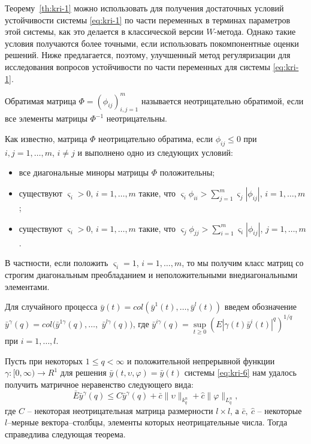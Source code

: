 Теорему~\ref{th:kri-1} можно использовать для получения достаточных условий
устойчивости системы \eqref{eq:kri-1} по части переменных в терминах параметров
этой системы, как это делается в классической версии $W$-метода.
Однако такие условия получаются более точными, если использовать
покомпонентные оценки решений. Ниже предлагается, поэтому,
улучшенный метод регуляризации для исследования вопросов
устойчивости по части переменных для системы \eqref{eq:kri-1}.

\begin{definition}\label{def:kri-4}
    Обратимая матрица $\Phi =
    (\phi_{ij})^m_{i,j=1}$ называется неотрицательно обратимой, если все
    элементы матрицы $\Phi^{-1}$ неотрицательны.
\end{definition}

Как известно, матрица $\Phi$ неотрицательно обратима, если
$\phi_{ij} \leq 0$ при $i, j = 1,\dots,m$, $i\neq j$ и выполнено одно
из следующих условий:
\begin{itemize}
    \item все диагональные миноры матрицы $\Phi$ положительны;
    
    \item существуют $\varsigma _i > 0$, $i = 1,\dots,m$ такие, что
    $\varsigma_i \phi_{ii} > \sum \limits _{j=1}^m \varsigma_j
    |\phi_{ij}|$, $i = 1,\dots,m$;
    
    \item существуют $\varsigma _i>0$, $i = 1,\dots,m$ такие, что $\varsigma_j
    \phi_{jj} > \sum \limits _{i=1}^m\varsigma_i |\phi_{ij}|$, $j =
    1,\dots,m$.
\end{itemize}

В частности, если положить $\varsigma _i = 1$, $i = 1,\dots,m$, то мы
получим класс матриц со строгим диагональным преобладанием и
неположительными внедиагональными элементами.

Для случайного процесса $\bar y(t) = col(\bar y^1(t),\dots, \bar
y^l(t))$ введем обозначение $ \bar y^\gamma (q) = col (\bar
y^{1\gamma }(q),\dots,$ $\bar y^{l\gamma }(q))$, где $\bar y^{i\gamma
}(q) = \sup \limits _{t \geq 0}\left (E|\gamma (t) \bar
y^i(t)|^{q}\right )^{1/q}$ при $i = 1,\dots,l$.

Пусть при некоторых $1\le q < \infty $ и положительной непрерывной
функции $\gamma :[0, \infty) \rightarrow R^1 $ для решения $\bar
y(t,\upsilon,\varphi) =  \bar y(t)$ системы \eqref{eq:kri-6} нам удалось
получить матричное неравенство следующего вида:
\begin{equation}
    \label{eq:kri-9}
    \bar E\bar y^\gamma (q) \leq C\bar y^\gamma (q) + \bar
    c\|\upsilon\|_{k^n_{q}} + \hat c \|\varphi \|_{L^n_q} ,
\end{equation}
где $C$ -- некоторая неотрицательная матрица размерности $l\times
l$, а $\bar c, \ \hat c$ -- некоторые $l$--мерные вектора--столбцы,
элементы которых неотрицательные числа. Тогда справедлива следующая
теорема.

